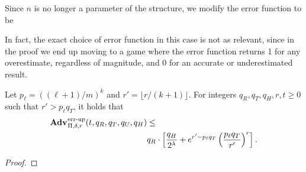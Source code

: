 Since $n$ is no longer a parameter of the structure, we modify the error
function to be %

In fact, the exact choice of error function in this case is not as relevant,
since in the proof we end up moving to a game where the error function returns
1 for any overestimate, regardless of magnitude, and 0 for an accurate or
underestimated result.

\begin{theorem}\label{thm:count-ms-bound}
Let $p_\ell = ((\ell+1)/m)^k$ and $r' = \lfloor r/(k+1) \rfloor$. For integers $q_R, q_T, q_H, r, t \geq 0$ such
that $r' > p_\ell q_T$, it holds that
  \begin{equation*}
  \begin{aligned}
    \Adv{\errep}_{\Pi,\delta,r}(t, q_R,q_T,q_U,q_H) &\leq \\
     & q_R \cdot \left[\frac{q_H}{2^\lambda} + e^{r'-p_\ell q_T}\left(\frac{p_\ell q_T}{r'}\right)^r\right].
  \end{aligned}
\end{equation*}
\end{theorem}

\begin{proof}
  
\end{proof}